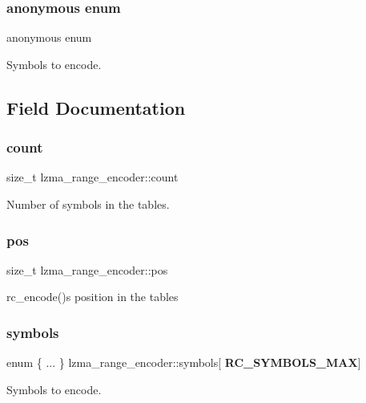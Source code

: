 \subsubsection{anonymous enum}
{\footnotesize\ttfamily anonymous enum}



Symbols to encode. 



\subsection{Field Documentation}
\mbox{\label{structlzma__range__encoder_ab1b7f905ce76607567a5823d04e98404}} 
\subsubsection{count}
{\footnotesize\ttfamily size\+\_\+t lzma\+\_\+range\+\_\+encoder\+::count}



Number of symbols in the tables. 

\mbox{\label{structlzma__range__encoder_af4b8146a2e4a06d6e5d3a6d7ab56dd31}} 
\subsubsection{pos}
{\footnotesize\ttfamily size\+\_\+t lzma\+\_\+range\+\_\+encoder\+::pos}



rc\+\_\+encode()\textquotesingle{}s position in the tables 

\mbox{\label{structlzma__range__encoder_a216ad04a72e78ac2e961b880513ac83b}} 
\subsubsection{symbols}
{\footnotesize\ttfamily enum \{ ... \}   lzma\+\_\+range\+\_\+encoder\+::symbols[\textbf{ R\+C\+\_\+\+S\+Y\+M\+B\+O\+L\+S\+\_\+\+M\+AX}]}



Symbols to encode. 

